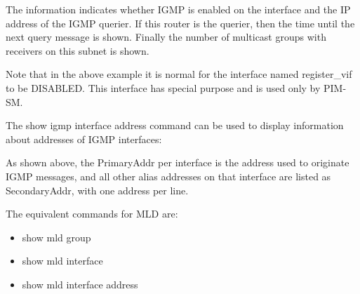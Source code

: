 The information indicates whether IGMP is enabled on the
interface and the IP address of the IGMP querier.  If this router is
the querier, then the time until the next query message is shown.
Finally the number of multicast groups with receivers on this subnet
is shown.

Note that in the above example it is normal for the interface named
{\stt register\_vif} to be {\stt DISABLED}. This interface has special
purpose and is used only by PIM-SM.

\vspace{0.1in}
The {\stt show igmp interface address} command can be used to display
information about addresses of IGMP interfaces:

\vspace{0.1in}
\noindent{}
\vspace{0.1in}

As shown above, the {\stt PrimaryAddr} per interface is the address
used to originate IGMP messages, and all other alias addresses on that
interface are listed as {\stt SecondaryAddr}, with one address per
line.

The equivalent commands for MLD are:
\begin{itemize}
\item {\stt show mld group}
\item {\stt show mld interface}
\item {\stt show mld interface address}
\end{itemize}
